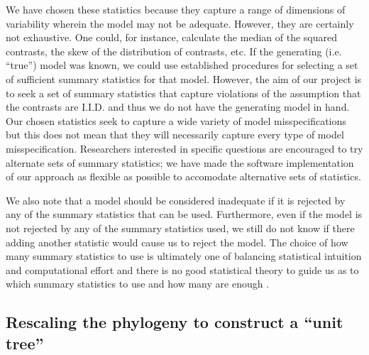\documentclass[a4paper,12pt]{article}
\begin{document}
We have chosen these statistics because they capture a range of dimensions of variability wherein the model may not be adequate. However, they are certainly not exhaustive. One could, for instance, calculate the median of the squared contrasts, the skew of the distribution of contrasts, etc. If the generating (i.e. ``true'') model was known, we could use established procedures for selecting a set of sufficient \citep[or approximately sufficient;][]{ MajoramJoyce} summary statistics for that model. However, the aim of our project is to seek a set of summary statistics that capture violations of the assumption that the contrasts are I.I.D. and thus we do not have the generating model in hand. Our chosen statistics seek to capture a wide variety of model misspecifications but this does not mean that they will necessarily capture every type of model misspecification. Researchers interested in specific questions are encouraged to try alternate sets of summary statistics; we have made the software implementation of our approach as flexible as possible to accomodate alternative sets of statistics.

We also note that a model should be considered inadequate if it is rejected by any of the summary statistics that can be used. Furthermore, even if the model is not rejected by any of the summary statistics used, we still do not know if there adding another statistic would cause us to reject the model. The choice of how many summary statistics to use is ultimately one of balancing statistical intuition and computational effort and there is no good statistical theory to guide us as to which summary statistics to use and how many are enough \citep{Gelmanbook}.

\subsection*{Rescaling the phylogeny to construct a ``unit tree''}
\end{document}
